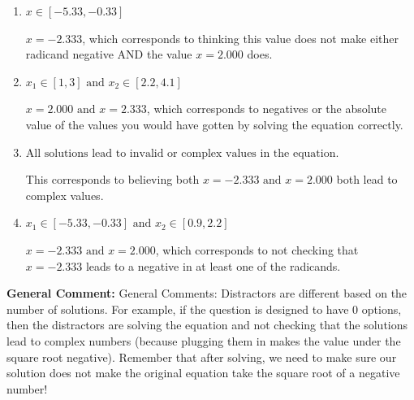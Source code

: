 \documentclass{extbook}[14pt]
\begin{document}
\begin{enumerate}
{\begin{enumerate}[label=\Alph*.]
* This is the correct option.
\item \( x \in [-5.33,-0.33] \)

$x = -2.333$, which corresponds to thinking this value does not make either radicand negative AND the value $x = 2.000$ does.
\item \( x_1 \in [1, 3] \text{ and } x_2 \in [2.2,4.1] \)

$x = 2.000 \text{ and } x = 2.333$, which corresponds to negatives or the absolute value of the values you would have gotten by solving the equation correctly.
\item \( \text{All solutions lead to invalid or complex values in the equation.} \)

This corresponds to believing both $x = -2.333 \text{ and } x = 2.000$ both lead to complex values.
\item \( x_1 \in [-5.33, -0.33] \text{ and } x_2 \in [0.9,2.2] \)

$x = -2.333 \text{ and } x = 2.000$, which corresponds to not checking that $x = -2.333$ leads to a negative in at least one of the radicands.
\end{enumerate}

\textbf{General Comment:} General Comments: Distractors are different based on the number of solutions. For example, if the question is designed to have 0 options, then the distractors are solving the equation and not checking that the solutions lead to complex numbers (because plugging them in makes the value under the square root negative). Remember that after solving, we need to make sure our solution does not make the original equation take the square root of a negative number!
}
\end{enumerate}
\end{document}
